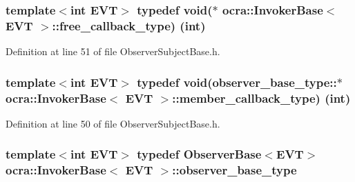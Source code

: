 \subsubsection[{\texorpdfstring{free\+\_\+callback\+\_\+type}{free_callback_type}}]{\setlength{\rightskip}{0pt plus 5cm}template$<$int E\+VT$>$ typedef void($\ast$ {\bf ocra\+::\+Invoker\+Base}$<$ E\+VT $>$\+::free\+\_\+callback\+\_\+type) (int)\hspace{0.3cm}{\ttfamily [protected]}}\hypertarget{classocra_1_1InvokerBase_a19d9d2e44df4df24b203e918ead8d01e}{}\label{classocra_1_1InvokerBase_a19d9d2e44df4df24b203e918ead8d01e}


Definition at line 51 of file Observer\+Subject\+Base.\+h.

\subsubsection[{\texorpdfstring{member\+\_\+callback\+\_\+type}{member_callback_type}}]{\setlength{\rightskip}{0pt plus 5cm}template$<$int E\+VT$>$ typedef void(observer\+\_\+base\+\_\+type\+::$\ast$ {\bf ocra\+::\+Invoker\+Base}$<$ E\+VT $>$\+::member\+\_\+callback\+\_\+type) (int)\hspace{0.3cm}{\ttfamily [protected]}}\hypertarget{classocra_1_1InvokerBase_ab20a012fb61b3ffde70547b1f696f3bc}{}\label{classocra_1_1InvokerBase_ab20a012fb61b3ffde70547b1f696f3bc}


Definition at line 50 of file Observer\+Subject\+Base.\+h.

\subsubsection[{\texorpdfstring{observer\+\_\+base\+\_\+type}{observer_base_type}}]{\setlength{\rightskip}{0pt plus 5cm}template$<$int E\+VT$>$ typedef {\bf Observer\+Base}$<$E\+VT$>$ {\bf ocra\+::\+Invoker\+Base}$<$ E\+VT $>$\+::{\bf observer\+\_\+base\+\_\+type}\hspace{0.3cm}{\ttfamily [protected]}}\hypertarget{classocra_1_1InvokerBase_a186d1d95173d5875d4cdf113312d3b12}{}\label{classocra_1_1InvokerBase_a186d1d95173d5875d4cdf113312d3b12}



